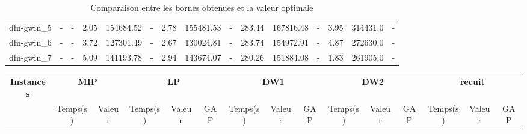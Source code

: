 \documentclass[main.tex]{subfiles}
\begin{document}
\begin{landscape}
\begin{table}[h]
\begin{tabular}{c|cc|ccc|ccc|ccc|ccc}
	dfn-gwin\_5 &- &- &2.05 &154684.52 &- &2.78 &155481.53 &- &283.44 &167816.48 &- &3.95 &314431.0 &-\\
	dfn-gwin\_6 &- &- &3.72 &127301.49 &- &2.67 &130024.81 &- &283.74 &154972.91 &- &4.87 &272630.0 &-\\
	dfn-gwin\_7 &- &- &5.09 &141193.78 &- &2.94 &143674.07 &- &280.26 &151884.08 &- &1.83 &261905.0 &-\\
\end{tabular}\caption{Comparaison entre les bornes obtenues et la valeur optimale}
\end{table}
\end{landscape}
\newpage
\thispagestyle{empty}
\begin{landscape}
\begin{table}[h]
    \centering
    \begin{tabular}{c|cc|ccc|ccc|ccc|ccc}
	\hline	
	\textbf{Instances} &\multicolumn{2}{c}{\textbf{MIP}} &\multicolumn{3}{c}{\textbf{LP}} &\multicolumn{3}{c}{\textbf{DW1}} &\multicolumn{3}{c}{\textbf{DW2}} &\multicolumn{3}{c}{\textbf{recuit}}\\
	 &Temps(s) &Valeur &Temps(s) &Valeur &GAP &Temps(s) &Valeur &GAP &Temps(s) &Valeur &GAP &Temps(s) &Valeur &GAP\\


\end{tabular}
\end{table}
\end{landscape}
\end{document}
